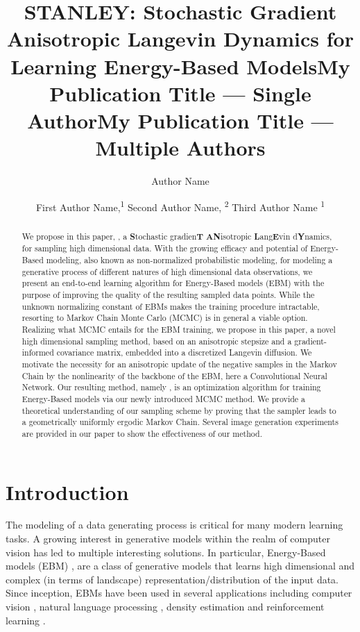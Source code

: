 \documentclass[letterpaper]{article} %
\title{STANLEY: Stochastic Gradient Anisotropic Langevin Dynamics for Learning Energy-Based Models}
\title{My Publication Title --- Single Author}
\author {
    Author Name
}
\title{My Publication Title --- Multiple Authors}
\author {
    First Author Name,\textsuperscript{\rm 1}
    Second Author Name, \textsuperscript{\rm 2}
    Third Author Name \textsuperscript{\rm 1}
}
\begin{document}
\maketitle

\begin{abstract}\vspace{-0.1in}
We propose in this paper, \textbf{\algo}, a \textbf{S}tochastic gradien\textbf{T} \textbf{AN}isotropic \textbf{L}ang\textbf{E}vin d\textbf{Y}namics, for sampling high dimensional data.
With the growing efficacy and potential of Energy-Based modeling, also known as non-normalized probabilistic modeling, for modeling a generative process of different natures of high dimensional data observations, we present an end-to-end learning algorithm for Energy-Based models (EBM) with the purpose of improving the quality of the resulting sampled data points.
While the unknown normalizing constant of EBMs makes the training procedure intractable, resorting to Markov Chain Monte Carlo (MCMC) is in general a viable option.
Realizing what MCMC entails for the EBM training, we propose in this paper, a novel high dimensional sampling method, based on an anisotropic stepsize and a gradient-informed covariance matrix, embedded into a discretized Langevin diffusion.
We motivate the necessity for an anisotropic update of the negative samples in the Markov Chain by the nonlinearity of the backbone of the EBM, here a Convolutional Neural Network.
Our resulting method, namely \algo, is an optimization algorithm for training Energy-Based models via our newly introduced MCMC method.
We provide a theoretical understanding of our sampling scheme by proving that the sampler leads to a geometrically uniformly ergodic Markov Chain.
Several image generation experiments are provided in our paper to show the effectiveness of our method.
\end{abstract}

\vspace{-0.15in}
\section{Introduction}
The modeling of a data generating process is critical for many modern learning tasks.
A growing interest in generative models within the realm of computer vision has led to multiple interesting solutions.
In particular, Energy-Based models (EBM) \cite{zhu1998filters,lecun2006tutorial}, are a class of generative models that learns high dimensional and complex (in terms of landscape) representation/distribution of the input data.
Since inception, EBMs have been used in several applications including computer vision \cite{ngiam2011learning, xie2016theory,xie2020generative,du2019implicit}, natural language processing \cite{mikolov2013distributed,deng2020residual},  density estimation \cite{wenliang2019learning,song2020sliced} and reinforcement learning \cite{haarnoja2017reinforcement}.
\end{document}
